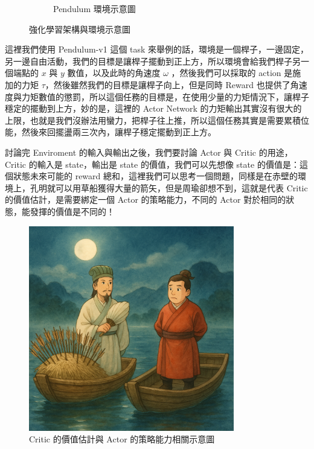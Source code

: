 \begin{figure}[h]
\begin{subfigure}[b]{0.48\textwidth}
        \caption{Pendulum 環境示意圖}
        \label{fig:pendulum}
    \end{subfigure}
    \caption{強化學習架構與環境示意圖}
    \label{fig:RL_and_pendulum}
\end{figure}

這裡我們使用 Pendulum-v1 這個 task 來舉例的話，環境是一個桿子，一邊固定，另一邊自由活動，我們的目標是讓桿子擺動到正上方，所以環境會給我們桿子另一個端點的 $x$ 與 $y$ 數值，以及此時的角速度 $\omega$ ，然後我們可以採取的 action 是施加的力矩 $\tau$，然後雖然我們的目標是讓桿子向上，但是同時 Reward 也提供了角速度與力矩數值的懲罰，所以這個任務的目標是，在使用少量的力矩情況下，讓桿子穩定的擺動到上方，妙的是，這裡的 Actor Network 的力矩輸出其實沒有很大的上限，也就是我們沒辦法用蠻力，把桿子往上推，所以這個任務其實是需要累積位能，然後來回擺盪兩三次內，讓桿子穩定擺動到正上方。

討論完 Enviroment 的輸入與輸出之後，我們要討論 Actor 與 Critic 的用途，Critic 的輸入是 state，輸出是 state 的價值，我們可以先想像 state 的價值是：這個狀態未來可能的 reward 總和，這裡我們可以思考一個問題，同樣是在赤壁的環境上，孔明就可以用草船獲得大量的箭矢，但是周瑜卻想不到，這就是代表 Critic 的價值估計，是需要綁定一個 Actor 的策略能力，不同的 Actor 對於相同的狀態，能發揮的價值是不同的！

\begin{figure}[h]
    \centering
    \includegraphics[width=0.8\textwidth]{figures/Critic_value_depend_on_Actor.png}
    \caption{Critic 的價值估計與 Actor 的策略能力相關示意圖}
    \label{fig:Critic_value_depend_on_Actor}
\end{figure}

